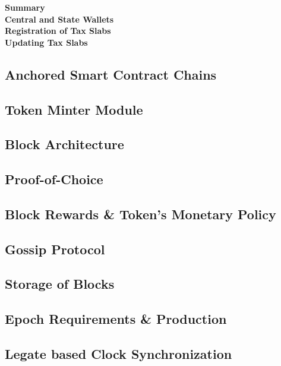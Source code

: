 \documentclass[letterpaper,11pt]{article}
\begin{document}
\textbf{Summary}\\

\textbf{Central and State Wallets}\\

\textbf{Registration of Tax Slabs}\\

\textbf{Updating Tax Slabs}\\


\subsection{Anchored Smart Contract Chains}

\subsection{Token Minter Module}
	
\subsection{Block Architecture}

\subsection{Proof-of-Choice}

\subsection{Block Rewards \& Token's Monetary Policy}
	
\subsection{Gossip Protocol}

\subsection{Storage of Blocks}
	
\subsection{Epoch Requirements \& Production}
	
\subsection{Legate based Clock Synchronization}
	
\end{document}
